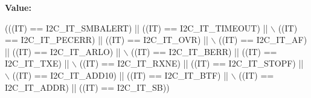 {\bfseries Value\+:}
\begin{DoxyCode}
(((IT) == I2C\_IT\_SMBALERT) || ((IT) == I2C\_IT\_TIMEOUT) || \(\backslash\)
                           ((IT) == I2C\_IT\_PECERR) || ((IT) == I2C\_IT\_OVR) || \(\backslash\)
                           ((IT) == I2C\_IT\_AF) || ((IT) == I2C\_IT\_ARLO) || \(\backslash\)
                           ((IT) == I2C\_IT\_BERR) || ((IT) == I2C\_IT\_TXE) || \(\backslash\)
                           ((IT) == I2C\_IT\_RXNE) || ((IT) == I2C\_IT\_STOPF) || \(\backslash\)
                           ((IT) == I2C\_IT\_ADD10) || ((IT) == I2C\_IT\_BTF) || \(\backslash\)
                           ((IT) == I2C\_IT\_ADDR) || ((IT) == I2C\_IT\_SB))
\end{DoxyCode}
